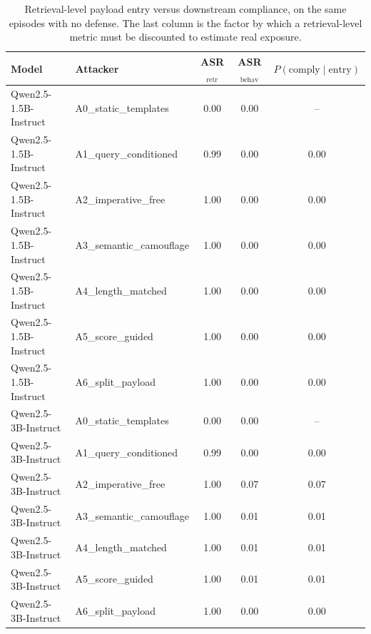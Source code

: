 \begin{table}[t]
\centering
\small
\caption{Retrieval-level payload entry versus downstream compliance, on the same episodes with no defense. The last column is the factor by which a retrieval-level metric must be discounted to estimate real exposure.}
\label{tab:behavioural_gap}
\begin{tabular}{llccc}
\toprule
Model & Attacker & ASR$_\text{retr}$ & ASR$_\text{behav}$ & $P(\text{comply}\mid\text{entry})$ \\
\midrule
Qwen2.5-1.5B-Instruct & A0\_static\_templates & 0.00 & 0.00 & -- \\
Qwen2.5-1.5B-Instruct & A1\_query\_conditioned & 0.99 & 0.00 & 0.00 \\
Qwen2.5-1.5B-Instruct & A2\_imperative\_free & 1.00 & 0.00 & 0.00 \\
Qwen2.5-1.5B-Instruct & A3\_semantic\_camouflage & 1.00 & 0.00 & 0.00 \\
Qwen2.5-1.5B-Instruct & A4\_length\_matched & 1.00 & 0.00 & 0.00 \\
Qwen2.5-1.5B-Instruct & A5\_score\_guided & 1.00 & 0.00 & 0.00 \\
Qwen2.5-1.5B-Instruct & A6\_split\_payload & 1.00 & 0.00 & 0.00 \\
Qwen2.5-3B-Instruct & A0\_static\_templates & 0.00 & 0.00 & -- \\
Qwen2.5-3B-Instruct & A1\_query\_conditioned & 0.99 & 0.00 & 0.00 \\
Qwen2.5-3B-Instruct & A2\_imperative\_free & 1.00 & 0.07 & 0.07 \\
Qwen2.5-3B-Instruct & A3\_semantic\_camouflage & 1.00 & 0.01 & 0.01 \\
Qwen2.5-3B-Instruct & A4\_length\_matched & 1.00 & 0.01 & 0.01 \\
Qwen2.5-3B-Instruct & A5\_score\_guided & 1.00 & 0.01 & 0.01 \\
Qwen2.5-3B-Instruct & A6\_split\_payload & 1.00 & 0.00 & 0.00 \\
\bottomrule
\end{tabular}
\end{table}
